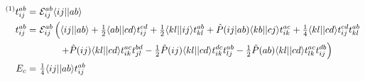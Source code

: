 \documentclass[preview]{standalone}
\newcommand{\op}[1]{\ensuremath{ \hat{#1} } }
\newcommand{\ip}[1]{\ensuremath{\langle#1\rangle}}
\newcommand{\E}{\mathcal{E}}
\begin{document}
\begin{align*}
  {}^{(1)}t_{ij}^{ab}
=&\
  \E_{ij}^{ab}\ip{ij||ab}
\\
  t_{ij}^{ab}
=&\
  \E_{ij}^{ab}
  \left(
    \ip{ij||ab}
  +
    \tfrac{1}{2}
    \ip{ab||cd}t_{ij}^{cd}
  +
    \tfrac{1}{2}
    \ip{kl||ij}t_{kl}^{ab}
  +
    \op{P}(ij|ab)
    \ip{kb||cj}t_{ik}^{ac}
  +
    \tfrac{1}{4}
    \ip{kl||cd}t_{ij}^{cd}t_{kl}^{ab}
  \right.
  \\&\ \hphantom{\E_{ij}^{ab}\ \ }\left.
  +
    \op{P}(ij)
    \ip{kl||cd}t_{ik}^{ac}t_{jl}^{bd}
  -
    \tfrac{1}{2}
    \op{P}(ij)
    \ip{kl||cd}t_{ik}^{dc}t_{lj}^{ab}
  -
    \tfrac{1}{2}
    \op{P}(ab)
    \ip{kl||cd}t_{lk}^{ac}t_{ij}^{db}
  \right)
\\
  E_c
=&\
  \tfrac{1}{4}
  \ip{ij||ab}t_{ij}^{ab}
\end{align*}
\end{document}
